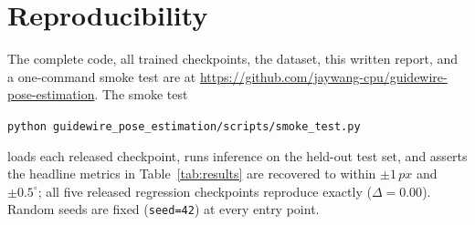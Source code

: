 \documentclass[conference,10pt,letterpaper]{IEEEtran}
\newcommand{\px}{\,px}
\begin{document}
\section*{Reproducibility}
The complete code, all trained checkpoints, the dataset, this written
report, and a one-command smoke test are at
\url{https://github.com/jaywang-cpu/guidewire-pose-estimation}. The
smoke test
\begin{center}
\texttt{python guidewire\_pose\_estimation/scripts/smoke\_test.py}
\end{center}
loads each released checkpoint, runs inference on the held-out test
set, and asserts the headline metrics in Table~\ref{tab:results} are
recovered to within $\pm 1\px$ and $\pm 0.5^\circ$; all five released
regression checkpoints reproduce exactly ($\Delta{=}0.00$). Random
seeds are fixed (\texttt{seed=42}) at every entry point.



\end{document}
